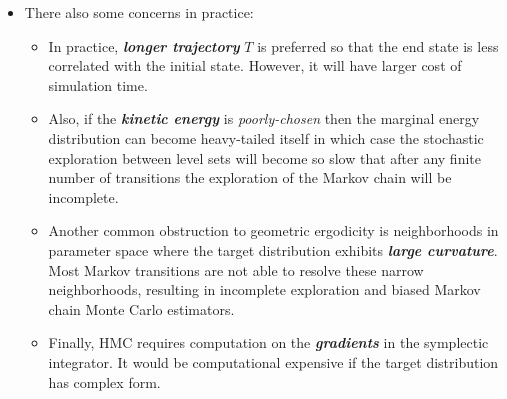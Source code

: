 \documentclass[11pt]{article}
\begin{document}
\begin{itemize}
\item There also some concerns in practice:
\begin{itemize}
\item In practice, \emph{\textbf{longer trajectory}} $T$ is preferred so that the end state is less correlated with the initial state. However, it will have larger cost of simulation time.

\item Also, if the \emph{\textbf{kinetic energy}} is \emph{poorly-chosen} then the marginal energy distribution can become heavy-tailed itself in which case the stochastic exploration between level sets will become so slow that after any finite number of transitions the exploration of the Markov chain will be incomplete.

\item Another common obstruction to geometric ergodicity is neighborhoods in parameter space where the target distribution exhibits \emph{\textbf{large curvature}}. Most Markov transitions are not able to resolve these narrow neighborhoods, resulting in incomplete exploration and biased Markov chain Monte Carlo estimators. 

\item Finally, HMC requires computation on the \emph{\textbf{gradients}} in the symplectic integrator. It would be computational expensive if the target distribution has complex form.
\end{itemize}
\end{itemize}
\end{document}
